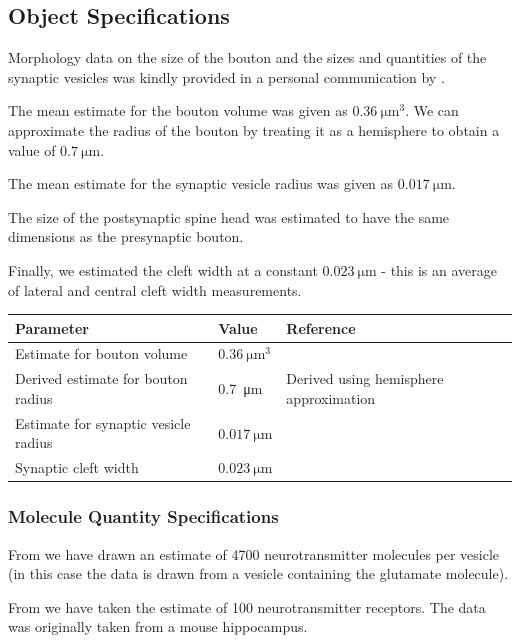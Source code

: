 \documentclass[a4paper]{article}
\begin{document}
\subsection{Object Specifications}
Morphology data on the size of the bouton and the sizes and quantities of the synaptic vesicles was kindly provided in a personal communication by \cite{Rollehagen::2015}. 

The mean estimate for the bouton volume was given as $\SI{0.36}{\micro\meter\cubed}$. We can approximate the radius of the bouton by treating it as a hemisphere to obtain a value of $\SI{0.7}{\micro\metre}$. 

The mean estimate for the synaptic vesicle radius was given as $\SI{0.017}{\micro\meter}$.

The size of the postsynaptic spine head was estimated to have the same dimensions as the presynaptic bouton.

Finally, we estimated the cleft width at a constant $\SI{0.023}{\micro\meter}$ - this is an average of lateral and central cleft width measurements.

\begin{table}[H]
\begin{tabular}{lll}
Parameter & Value & Reference \\ \hline
Estimate for bouton volume&  $\SI{0.36}{\micro\meter\cubed}$& \cite{Rollehagen::2015} \\ 
Derived estimate for bouton radius & \SI{0.7}{\micro\meter} & Derived using hemisphere approximation\\
Estimate for synaptic vesicle radius & $\SI{0.017}{\micro\meter}$ & \cite{Rollehagen::2015}\\ 
Synaptic cleft width &$\SI{0.023}{\micro\meter}$& \cite{Rollehagen::2015}\\
\end{tabular}
\end{table}

\subsubsection{Molecule Quantity Specifications}
From \cite{Bruns:Nature:1995} we have drawn an estimate of 4700 neurotransmitter molecules per vesicle (in this case the data is drawn from a vesicle containing the glutamate molecule).

From \cite{Stricker:JPhysiol:1996} we have taken the estimate of 100 neurotransmitter receptors. The data was originally taken from a mouse hippocampus. 
\end{document}
